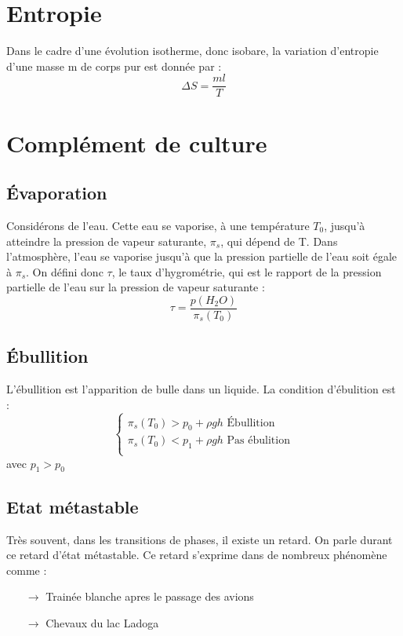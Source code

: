 \section{Entropie}
\begin{de}
Dans le cadre d'une évolution isotherme, donc isobare, la variation d'entropie d'une masse m de corps pur est donnée par : 
$$\Delta S= \dfrac{ml}{T}$$
\end{de}
\section{Complément de culture}
\subsection{Évaporation}
Considérons de l'eau. Cette eau se vaporise, à une température $T_0$, jusqu'à atteindre la pression de vapeur saturante, $\pi_s$, qui dépend de T. Dans l'atmosphère, l'eau se vaporise jusqu'à que la pression partielle de l'eau soit égale à $\pi_s$. On défini donc $\tau$, le taux d'hygrométrie, qui est le rapport de la pression partielle de l'eau sur la pression de vapeur saturante :
$$\tau = \dfrac{p(H_2O)}{\pi_s(T_0)}$$
\subsection{Ébullition}
L'ébullition est l'apparition de bulle dans un liquide. La condition d'ébulition est :
\[\left\{\begin{array}{l}
\pi_s(T_0)> p_0 + \rho gh \mbox{ Ébullition}\\
\pi_s(T_0)< p_1 + \rho gh  \mbox{ Pas ébulition} \\
\end{array}\right.\]
avec $p_1>p_0$
\subsection{Etat métastable}
Très souvent, dans les transitions de phases, il existe un retard. On parle durant ce retard d'état métastable. Ce retard s'exprime dans de nombreux phénomène comme : 
\begin{itemize}
 \item[$\rightarrow$] Trainée blanche apres le passage des avions
 \item[$\rightarrow$] Chevaux du lac Ladoga
\end{itemize}

